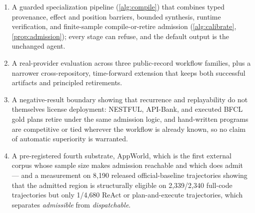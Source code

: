 \begin{enumerate}[leftmargin=1.2em,itemsep=1pt,topsep=2pt]
  \item A guarded specialization pipeline (\cref{alg:compile}) that combines
  typed provenance, effect and position barriers, bounded synthesis, runtime
  verification, and finite-sample compile-or-retire admission
  (\cref{alg:calibrate}, \cref{prop:admission}); every stage can refuse, and the
  default output is the unchanged agent.
  \item A real-provider evaluation across three public-record workflow families,
  plus a narrower cross-repository, time-forward extension that keeps both
  successful artifacts and principled retirements.
  \item A negative-result boundary showing that recurrence and replayability do
  not themselves license deployment: NESTFUL, API-Bank, and executed BFCL gold
  plans retire under the same admission logic, and hand-written programs are
  competitive or tied wherever the workflow is already known, so no claim of
  automatic superiority is warranted.
  \item A pre-registered fourth substrate, AppWorld, which is the first external
  corpus whose sample size makes admission reachable and which does admit --- and a
  measurement on 8{,}190 released official-baseline trajectories showing that the
  admitted region is structurally eligible on 2{,}339/2{,}340 full-code trajectories
  but only 1/4{,}680 ReAct or plan-and-execute trajectories, which separates
  \emph{admissible} from \emph{dispatchable}.
\end{enumerate}
